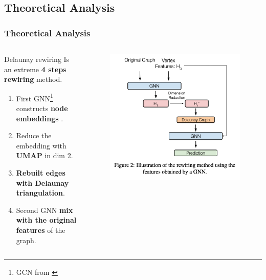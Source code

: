 \documentclass[10pt, aspectratio = 169]{beamer}
\begin{document}
\subsection{Theoretical Analysis}
\begin{frame}
    \frametitle{Theoretical Analysis}
    \begin{columns}
        \begin{column}{0.6\textwidth}
        \begin{block}{Delaunay rewiring}
            Is an extreme \textbf{4 steps rewiring} method.
            \begin{enumerate}
                \item First GNN\footnote{GCN from \cite[Kipf and Welling, 2017]{kipf2017semi}} constructs \textbf{node embeddings}   .
                \item Reduce the embedding with \textbf{UMAP} in dim 2.
                \item \textbf{Rebuilt edges with Delaunay triangulation}.
                \item Second GNN \textbf{mix with the original features} of the graph.
            \end{enumerate}

        \end{block}
        \end{column}
        \begin{column}{0.4\textwidth}
            \begin{figure}
                \includegraphics[width=0.99\textwidth]{figures/Rewiring_method.png}
            \end{figure}
        \end{column}
    \end{columns}
\end{frame}
\end{document}
